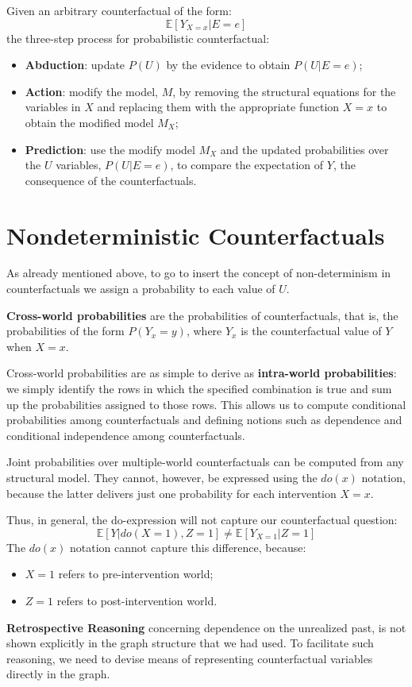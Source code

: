 Given an arbitrary counterfactual of the form:
\begin{equation*}
    \mathbb{E}[Y_{X = x} | E = e]
\end{equation*}
the three-step process for probabilistic counterfactual:
\begin{itemize}
    \item \textbf{Abduction}: update $P(U)$ by the evidence to obtain $P(U| E = e)$;
    \item \textbf{Action}: modify the model, $M$, by removing the structural equations for
          the variables in $X$ and replacing them with the appropriate function
          $X = x$ to obtain the modified model $M_X$;
    \item \textbf{Prediction}: use the modify model $M_X$ and the updated probabilities
          over the $U$ variables, $P(U| E = e)$, to compare the expectation of $Y$,
          the consequence of the counterfactuals.
\end{itemize}
\section{Nondeterministic Counterfactuals}
As already mentioned above, to go to insert the concept of non-determinism in
counterfactuals we assign a probability to each value of $U$.

\textbf{Cross-world probabilities} are the probabilities of counterfactuals, that
is, the probabilities of the form $P(Y_x = y)$, where $Y_x$ is the counterfactual
value of $Y$ when $X = x$.

Cross-world probabilities are as simple to derive as \textbf{intra-world probabilities}:
we simply identify the rows in which the specified combination is true and sum
up the probabilities assigned to those rows. This allows us to compute conditional
probabilities among counterfactuals and defining notions such as dependence and
conditional independence among counterfactuals.

Joint probabilities over multiple-world counterfactuals can be computed from any
structural model. They cannot, however, be expressed using the $do(x)$ notation,
because the latter delivers just one probability for each intervention $X = x$.

Thus, in general, the do-expression will not capture our counterfactual question:
\begin{equation*}
    \mathbb{E}[Y| do(X = 1), Z = 1] \neq \mathbb{E}[Y_{X = 1} | Z = 1]
\end{equation*}
The $do(x)$ notation cannot capture this difference, because:
\begin{itemize}
    \item $X = 1$ refers to pre-intervention world;
    \item $Z = 1$ refers to post-intervention world.
\end{itemize}

\textbf{Retrospective Reasoning} concerning dependence on the unrealized past, is
not shown explicitly in the graph structure that we had used. To facilitate
such reasoning, we need to devise means of representing counterfactual variables
directly in the graph.